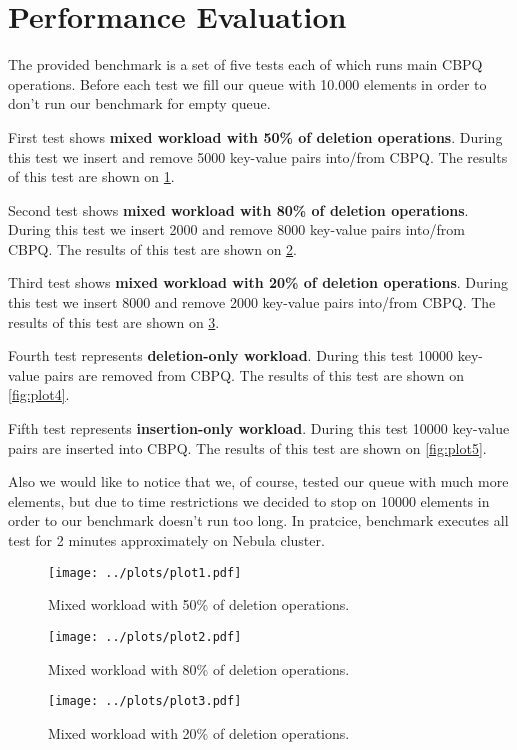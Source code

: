 \documentclass{article}
\begin{document}
\section{Performance Evaluation}
The provided benchmark is a set of five tests each of which runs main CBPQ operations. Before each test we fill our queue with 10.000 elements in order to don't run our benchmark for empty queue.\par
First test shows\textbf{ mixed workload with 50\% of deletion operations}. During this test we insert and remove 5000 key-value pairs into/from CBPQ. The results of this test are shown on \cref{fig:plot1}.\par
Second test shows \textbf{mixed workload with 80\% of deletion operations}. During this test we insert 2000 and remove 8000 key-value pairs into/from CBPQ. The results of this test are shown on \cref{fig:plot2}.\par
Third test shows \textbf{mixed workload with 20\% of deletion operations}. During this test we insert 8000 and remove 2000 key-value pairs into/from CBPQ. The results of this test are shown on \cref{fig:plot3}.\par
Fourth test represents \textbf{deletion-only workload}. During this test 10000 key-value pairs are removed from CBPQ. The results of this test are shown on \cref{fig:plot4}.\par
Fifth test represents \textbf{insertion-only workload}. During this test 10000 key-value pairs are inserted into CBPQ. The results of this test are shown on \cref{fig:plot5}.\par
Also we would like to notice that we, of course, tested our queue with much more elements, but due to time restrictions we decided to stop on 10000 elements in order to our benchmark doesn't run too long. In pratcice,  benchmark executes all test for 2 minutes approximately on Nebula cluster.

\begin{figure}[H]
  \centering
  \texttt{[image: ../plots/plot1.pdf]}
  \caption{Mixed workload with 50\% of deletion operations.}
  \label{fig:plot1}
\end{figure}

\begin{figure}[H]
  \centering
  \texttt{[image: ../plots/plot2.pdf]}
  \caption{Mixed workload with 80\% of deletion operations.}
  \label{fig:plot2}
\end{figure}

\begin{figure}[H]
  \centering
  \texttt{[image: ../plots/plot3.pdf]}
  \caption{Mixed workload with 20\% of deletion operations.}
  \label{fig:plot3}
\end{figure}
\end{document}
